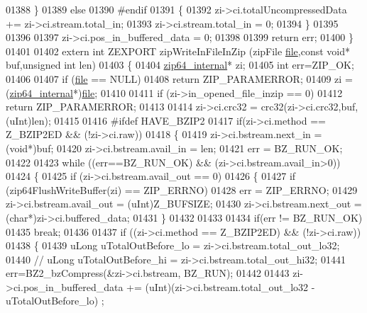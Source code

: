 \begin{DoxyCode}
01388     \}
01389     \textcolor{keywordflow}{else}
01390 \textcolor{preprocessor}{#endif}
01391     \{
01392       zi->ci.totalUncompressedData += zi->ci.stream.total\_in;
01393       zi->ci.stream.total\_in = 0;
01394     \}
01395 
01396 
01397     zi->ci.pos\_in\_buffered\_data = 0;
01398 
01399     \textcolor{keywordflow}{return} err;
01400 \}
01401 
01402 \textcolor{keyword}{extern} \textcolor{keywordtype}{int} ZEXPORT zipWriteInFileInZip (zipFile \hyperlink{structfile}{file},\textcolor{keyword}{const} \textcolor{keywordtype}{void}* buf,\textcolor{keywordtype}{unsigned} \textcolor{keywordtype}{int} len)
01403 \{
01404     \hyperlink{structzip64__internal}{zip64\_internal}* zi;
01405     \textcolor{keywordtype}{int} err=ZIP\_OK;
01406 
01407     \textcolor{keywordflow}{if} (\hyperlink{structfile}{file} == NULL)
01408         \textcolor{keywordflow}{return} ZIP\_PARAMERROR;
01409     zi = (\hyperlink{structzip64__internal}{zip64\_internal}*)\hyperlink{structfile}{file};
01410 
01411     \textcolor{keywordflow}{if} (zi->in\_opened\_file\_inzip == 0)
01412         \textcolor{keywordflow}{return} ZIP\_PARAMERROR;
01413 
01414     zi->ci.crc32 = crc32(zi->ci.crc32,buf,(uInt)len);
01415 
01416 \textcolor{preprocessor}{#ifdef HAVE\_BZIP2}
01417     \textcolor{keywordflow}{if}(zi->ci.method == Z\_BZIP2ED && (!zi->ci.raw))
01418     \{
01419       zi->ci.bstream.next\_in = (\textcolor{keywordtype}{void}*)buf;
01420       zi->ci.bstream.avail\_in = len;
01421       err = BZ\_RUN\_OK;
01422 
01423       \textcolor{keywordflow}{while} ((err==BZ\_RUN\_OK) && (zi->ci.bstream.avail\_in>0))
01424       \{
01425         \textcolor{keywordflow}{if} (zi->ci.bstream.avail\_out == 0)
01426         \{
01427           \textcolor{keywordflow}{if} (zip64FlushWriteBuffer(zi) == ZIP\_ERRNO)
01428             err = ZIP\_ERRNO;
01429           zi->ci.bstream.avail\_out = (uInt)Z\_BUFSIZE;
01430           zi->ci.bstream.next\_out = (\textcolor{keywordtype}{char}*)zi->ci.buffered\_data;
01431         \}
01432 
01433 
01434         \textcolor{keywordflow}{if}(err != BZ\_RUN\_OK)
01435           \textcolor{keywordflow}{break};
01436 
01437         \textcolor{keywordflow}{if} ((zi->ci.method == Z\_BZIP2ED) && (!zi->ci.raw))
01438         \{
01439           uLong uTotalOutBefore\_lo = zi->ci.bstream.total\_out\_lo32;
01440 \textcolor{comment}{//          uLong uTotalOutBefore\_hi = zi->ci.bstream.total\_out\_hi32;}
01441           err=BZ2\_bzCompress(&zi->ci.bstream,  BZ\_RUN);
01442 
01443           zi->ci.pos\_in\_buffered\_data += (uInt)(zi->ci.bstream.total\_out\_lo32 - uTotalOutBefore\_lo) ;

\end{DoxyCode}
